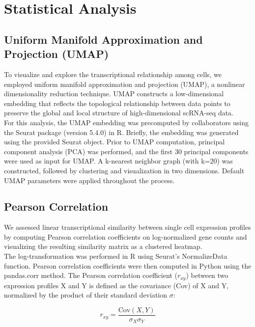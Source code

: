 \chapter{Statistical Analysis}
\label{chap:statAn}

\section{Uniform Manifold Approximation and Projection (UMAP)}
To visualize and explore the transcriptional relationship among cells, we employed uniform manifold approximation and projection (\gls{UMAP}), a nonlinear dimensionality reduction technique. UMAP constructs a low-dimensional embedding that reflects the topological relationship between data points to preserve the global and local structure of high-dimensional scRNA-seq data.
\\

For this analysis, the UMAP embedding was precomputed by collaborators using the Seurat package  (version 5.4.0) in R. Briefly, the embedding was generated using the provided Seurat object. Prior to UMAP computation, principal component analysis (\gls{PCA})
was performed, and the first 30 principal components were used as input for UMAP. A k-nearest neighbor graph (with k=20) was constructed, followed by clustering and visualization in two dimensions. Default UMAP parameters were applied throughout the process. 


\section{Pearson Correlation}
We assessed linear transcriptional similarity between single cell expression profiles by computing Pearson correlation coefficients on log-normalized gene counts and visualizing the resulting similarity matrix as a clustered heatmap. 
\\

The log-transformation was performed in R using Seurat’s NormalizeData function. Pearson correlation coefficients were then computed in Python using the pandas.corr method. The Pearson correlation coefficient ($r_{xy}$) between two expression profiles X and Y is defined as the covariance (Cov) of X and Y, normalized by the product of their standard deviation $\sigma$:

\begin{equation}
    \label{eq:pearson}
    r_{xy} = \frac{\text{Cov}(X,Y)}{\sigma_X \sigma_Y}
\end{equation}

